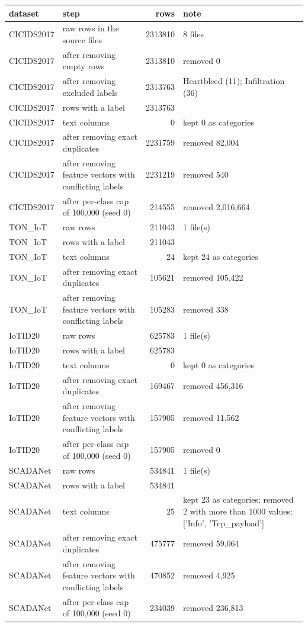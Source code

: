 \begin{tabular}{llrl}
\toprule
dataset & step & rows & note \\
\midrule
CICIDS2017 & raw rows in the source files & 2313810 & 8 files \\
CICIDS2017 & after removing empty rows & 2313810 & removed 0 \\
CICIDS2017 & after removing excluded labels & 2313763 & Heartbleed (11); Infiltration (36) \\
CICIDS2017 & rows with a label & 2313763 &  \\
CICIDS2017 & text columns & 0 & kept 0 as categories \\
CICIDS2017 & after removing exact duplicates & 2231759 & removed 82,004 \\
CICIDS2017 & after removing feature vectors with conflicting labels & 2231219 & removed 540 \\
CICIDS2017 & after per-class cap of 100,000 (seed 0) & 214555 & removed 2,016,664 \\
TON\_IoT & raw rows & 211043 & 1 file(s) \\
TON\_IoT & rows with a label & 211043 &  \\
TON\_IoT & text columns & 24 & kept 24 as categories \\
TON\_IoT & after removing exact duplicates & 105621 & removed 105,422 \\
TON\_IoT & after removing feature vectors with conflicting labels & 105283 & removed 338 \\
IoTID20 & raw rows & 625783 & 1 file(s) \\
IoTID20 & rows with a label & 625783 &  \\
IoTID20 & text columns & 0 & kept 0 as categories \\
IoTID20 & after removing exact duplicates & 169467 & removed 456,316 \\
IoTID20 & after removing feature vectors with conflicting labels & 157905 & removed 11,562 \\
IoTID20 & after per-class cap of 100,000 (seed 0) & 157905 & removed 0 \\
SCADANet & raw rows & 534841 & 1 file(s) \\
SCADANet & rows with a label & 534841 &  \\
SCADANet & text columns & 25 & kept 23 as categories; removed 2 with more than 1000 values: ['Info', 'Tcp\_payload'] \\
SCADANet & after removing exact duplicates & 475777 & removed 59,064 \\
SCADANet & after removing feature vectors with conflicting labels & 470852 & removed 4,925 \\
SCADANet & after per-class cap of 100,000 (seed 0) & 234039 & removed 236,813 \\
\bottomrule
\end{tabular}
